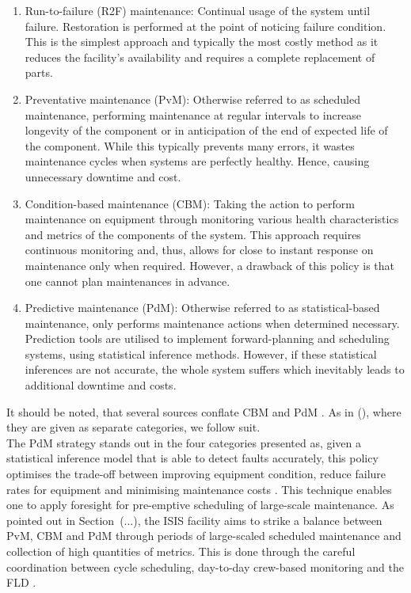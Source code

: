 \documentclass[10pt,oneside]{report}
\begin{document}
\begin{enumerate}
    \item{Run-to-failure (R2F) maintenance: Continual usage of the system until failure. Restoration is performed at the point of noticing failure condition. This is the simplest approach and typically the most costly method as it reduces the facility's availability and requires a complete replacement of parts.} 
    \item{Preventative maintenance (PvM): Otherwise referred to as scheduled maintenance, performing maintenance at regular intervals to increase longevity of the component or in anticipation of the end of expected life of the component. While this typically prevents many errors, it wastes maintenance cycles when systems are perfectly healthy. Hence, causing unnecessary downtime and cost.}
    \item{Condition-based maintenance (CBM): Taking the action to perform maintenance on equipment through monitoring various health characteristics and metrics of the components of the system. This approach requires continuous monitoring and, thus, allows for close to instant response on maintenance only when required. However, a drawback of this policy is that one cannot plan maintenances in advance.}
    \item{Predictive maintenance (PdM): Otherwise referred to as statistical-based maintenance, only performs maintenance actions when determined necessary. Prediction tools are utilised to implement forward-planning and scheduling systems, using statistical inference methods. However, if these statistical inferences are not accurate, the whole system suffers which inevitably leads to additional downtime and costs.}
\end{enumerate}
It should be noted, that several sources conflate CBM and PdM \cite{mobley2002introduction}. As in (\citet{susto2012predictive}), where they are given as separate categories, we follow suit. \\ 

The PdM strategy stands out in the four categories presented as, given a statistical inference model that is able to detect faults accurately, this policy optimises the trade-off between improving equipment condition, reduce failure rates for equipment and minimising maintenance costs \cite{carvalho2019systematic}. This technique enables one to apply foresight for pre-emptive scheduling of large-scale maintenance.  As pointed out in Section~(...), the ISIS facility aims to strike a balance between PvM, CBM and PdM through periods of large-scaled scheduled maintenance and collection of high quantities of metrics. This is done through the careful coordination between cycle scheduling, day-to-day crew-based monitoring and the FLD \cite{thomason2019isis}.
\end{document}
